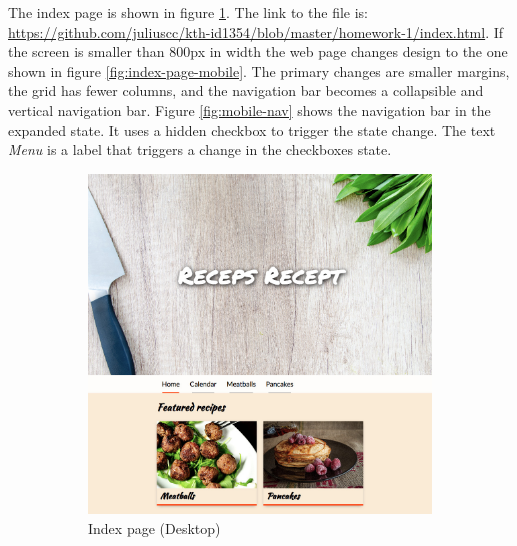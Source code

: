 \documentclass[a4paper]{scrartcl}
\begin{document}
The index page is shown in figure \ref{fig:index-page}. The link to the file is: \href{https://github.com/juliuscc/kth-id1354/blob/master/homework-1/index.html}{https://github.com/juliuscc/kth-id1354/blob/master/homework-1/index.html}. If the screen is smaller than 800px in width the web page changes design to the one shown in figure \ref{fig:index-page-mobile}. The primary changes are smaller margins, the grid has fewer columns, and the navigation bar becomes a collapsible and vertical navigation bar. Figure \ref{fig:mobile-nav} shows the navigation bar in the expanded state. It uses a hidden checkbox to trigger the state change. The text \textit{Menu} is a label that triggers a change in the checkboxes state.

\begin{figure}
	\centering
	\begin{subfigure}[b]{0.7\linewidth}
		\includegraphics[width=\linewidth]{images/screenshot-index.jpg}
		\caption{Index page (Desktop)}
		\label{fig:index-page}
	\end{subfigure}
	\begin{subfigure}[b]{0.2\linewidth}

\end{subfigure}
\end{figure}
\end{document}
